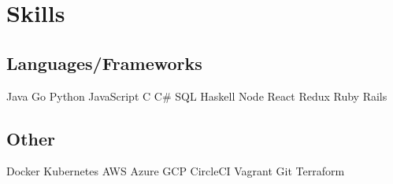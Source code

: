 \documentclass[]{deedy-resume}
\begin{document}
\section{Skills}
\begin{minipage}[t]{1.0\textwidth}
\subsection{Languages/Frameworks}
Java \textbullet{} Go \textbullet{} Python \textbullet{} JavaScript \textbullet{} C \textbullet{}
C\# \textbullet{} SQL \textbullet{} Haskell \textbullet{}
Node \textbullet{} React \textbullet{} Redux \textbullet{} Ruby \textbullet{} Rails
\sectionsep
\subsection{Other}
Docker \textbullet{} Kubernetes \textbullet{} AWS \textbullet{} Azure \textbullet{} GCP
\textbullet{} CircleCI \textbullet{} Vagrant \textbullet{} Git \textbullet{} Terraform
\sectionsep
\end{minipage}
\hfill
\end{document}
